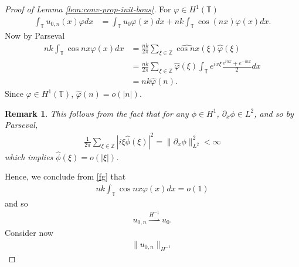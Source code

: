 \documentclass[12pt,reqno]{amsart}
\numberwithin{equation}{section}  %
\newcommand{\zz}{\mathbb{Z}}
\newcommand{\ci}{\mathbb{T}}
\newcommand{\wh}{\widehat}
\newcommand{\p}{\partial}
\newcommand{\vp}{\varphi}
\newtheorem{remark}[theorem]{Remark}
\begin{document}
\begin{proof}[Proof of Lemma \ref{lem:conv-prop-init-bous}]
  For $\vp \in H^{1}(\ci)$
%
%
\begin{equation*}
\begin{split}
  \int_{\ci} u_{0,n}(x) \vp dx
  & = \int_{\ci} u_{0} \vp(x) dx + nk \int_{\ci} \cos(nx) \vp(x) dx.
\end{split}
\end{equation*}
%
%
Now by Parseval
%
%
\begin{equation}
  \label{fg}
\begin{split}
  nk \int_{\ci} \cos nx \vp(x) dx
  & = \frac{nk}{2 \pi} \sum_{\xi \in \zz} \wh{\cos nx}(\xi) \wh{\vp}(\xi)
  \\
  & = \frac{nk}{2 \pi} \sum_{\xi \in \zz} \wh{\vp}(\xi) \int_{\ci} e^{ix \xi} \frac{e^{inx} +
  e^{-inx}}{2} dx
  \\
  & = nk \wh{\vp}(n).
\end{split}
\end{equation}
%
%
Since $\vp \in H^{1}(\ci)$, $\wh{\vp}(n) = o(| n |)$.
\begin{framed}
  \begin{remark}
    \label{rem:cont}
    This follows from the fact that for any $\phi \in H^{1}$, 
    $\p_{x} \phi \in L^{2}$, and so by Parseval,
%
%
\begin{equation*}
\begin{split}
 \frac{1}{2 \pi} \sum_{\xi \in \zz} | i \xi \wh{\phi}(\xi)
  |^{2}  = \| \p_{x} \phi \|_{L^{2}}^{2} < \infty
\end{split}
\end{equation*}
%
%
which implies $\wh{\phi}(\xi) = o(|\xi|)$. 
\end{remark}
\end{framed}
Hence, we conclude from \eqref{fg} that 
%
%
\begin{equation*}
\begin{split}
  nk \int_{\ci} \cos nx \vp(x) dx = o(1)
\end{split}
\end{equation*}
%
%
and so
%
%
\begin{equation*}
\begin{split}
  u_{0,n} \overset{H^{-1}}{\rightharpoonup} u_{0}.
\end{split}
\end{equation*}
%
%
Consider now
%
%
%
%
\begin{equation*}
\begin{split}
  \| u_{0,n} \|_{H^{-1}}

\end{split}
\end{equation*}
\end{proof}
\end{document}
